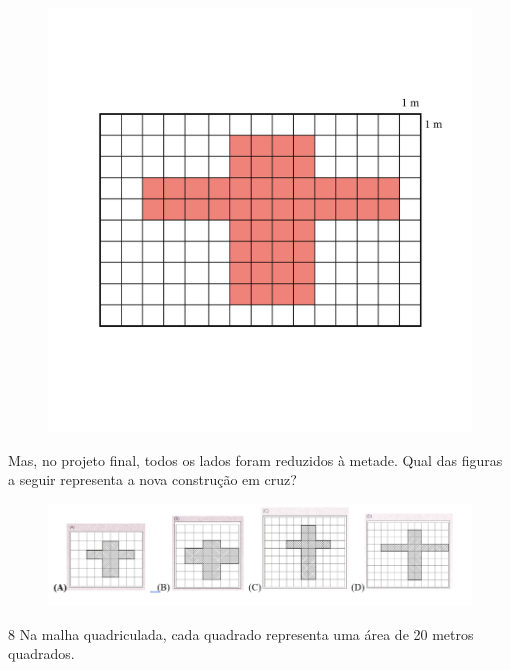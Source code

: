 \begin{figure}[htpb!]
\includegraphics[width=\textwidth]{../ilustracoes/MAT5/SAEB_5ANO_MAT_figura41.png}
\end{figure}

Mas, no projeto final, todos os lados foram reduzidos à metade. Qual das
figuras a seguir representa a nova construção em cruz?

\begin{figure}[htpb!]
\includegraphics[width=.5\textwidth]{./imgs/mat6.png}
\end{figure}


\num{8} Na malha quadriculada, cada quadrado representa uma área de
20 metros quadrados.

